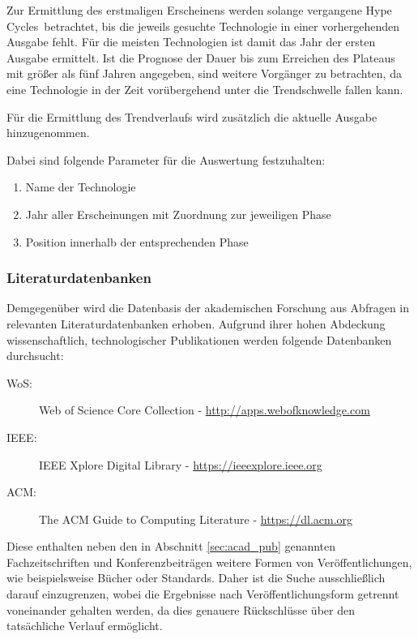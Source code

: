 Zur Ermittlung des erstmaligen Erscheinens werden solange vergangene \glqq Hype Cycles\grqq~betrachtet, bis die jeweils gesuchte Technologie in einer vorhergehenden Ausgabe fehlt. Für die meisten Technologien ist damit das Jahr der ersten Ausgabe ermittelt. Ist die Prognose der Dauer bis zum Erreichen des \glqq Plateaus\grqq~ mit größer als fünf Jahren angegeben, sind weitere Vorgänger zu betrachten, da eine Technologie in der Zeit vorübergehend unter die Trendschwelle fallen kann.

Für die Ermittlung des Trendverlaufs wird zusätzlich die aktuelle Ausgabe hinzugenommen.

Dabei sind folgende Parameter für die Auswertung festzuhalten:

\begin{enumerate}
	\item Name der Technologie
	\item Jahr aller Erscheinungen mit Zuordnung zur jeweiligen Phase
	\item Position innerhalb der entsprechenden Phase
\end{enumerate}

\subsubsection{Literaturdatenbanken}\label{sec:lit_data}
Demgegenüber wird die Datenbasis der akademischen Forschung aus Abfragen in relevanten Literaturdatenbanken erhoben. Aufgrund ihrer hohen Abdeckung wissenschaftlich, technologischer Publikationen werden folgende Datenbanken durchsucht:
\begin{description}
	\item [WoS:] Web of Science Core Collection - \url{http://apps.webofknowledge.com}
	\item [IEEE:] IEEE Xplore Digital Library - \url{https://ieeexplore.ieee.org}
	\item [ACM:] The ACM Guide to Computing Literature - \url{https://dl.acm.org}
\end{description}

Diese enthalten neben den in Abschnitt \ref{sec:acad_pub} genannten Fachzeitschriften und Konferenzbeiträgen weitere Formen von Veröffentlichungen, wie beispielsweise Bücher oder Standards. Daher ist die Suche ausschließlich darauf einzugrenzen, wobei die Ergebnisse nach Veröffentlichungsform getrennt voneinander gehalten werden, da dies genauere Rückschlüsse über den tatsächliche Verlauf ermöglicht.

